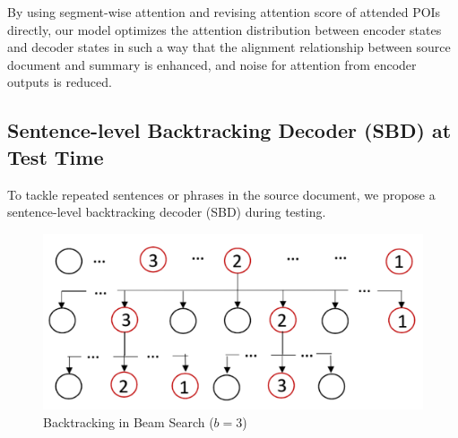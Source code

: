 

By using segment-wise attention and revising attention score of attended POIs directly,
our model optimizes the
attention distribution between encoder states and decoder states in such a way that
the alignment relationship between source document and summary is enhanced, and noise for attention from encoder outputs is reduced. 


\subsection{Sentence-level Backtracking Decoder (SBD) at Test Time}

To tackle repeated sentences or phrases in the source 
document, we propose a sentence-level backtracking decoder (SBD) during testing.

\begin{figure}[th]
    \centering
    \includegraphics[width=0.65\linewidth]{SBD}
    \caption{Backtracking in Beam Search ($b=3$)}
    \label{fig:beam}
\end{figure}


